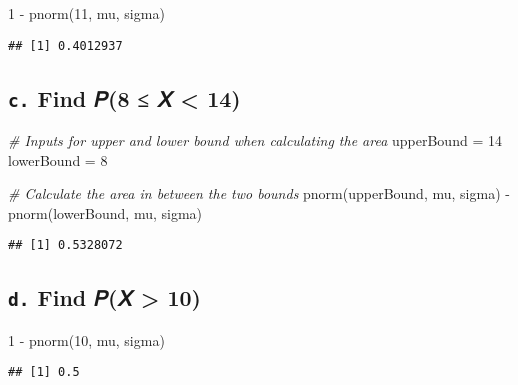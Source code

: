 \documentclass[
  12pt,
]{article}
\newenvironment{Shaded}{\begin{snugshade}}{\end{snugshade}}
\newcommand{\CommentTok}[1]{\textcolor[rgb]{0.56,0.35,0.01}{\textit{#1}}}
\newcommand{\DecValTok}[1]{\textcolor[rgb]{0.00,0.00,0.81}{#1}}
\newcommand{\FunctionTok}[1]{\textcolor[rgb]{0.00,0.00,0.00}{#1}}
\newcommand{\NormalTok}[1]{#1}
\newcommand{\OtherTok}[1]{\textcolor[rgb]{0.56,0.35,0.01}{#1}}
\newcommand{\SpecialCharTok}[1]{\textcolor[rgb]{0.00,0.00,0.00}{#1}}
\begin{document}
\begin{Shaded}
\begin{Highlighting}[]
\DecValTok{1} \SpecialCharTok{{-}} \FunctionTok{pnorm}\NormalTok{(}\DecValTok{11}\NormalTok{, mu, sigma)}
\end{Highlighting}
\end{Shaded}

\begin{verbatim}
## [1] 0.4012937
\end{verbatim}

\hypertarget{c.-find-ux1d4438-ux1d44b-14}{%
\subsection{\texorpdfstring{\texttt{c.} Find 𝑃(8 ≤ 𝑋 \textless{}
14)}{c. Find 𝑃(8 ≤ 𝑋 \textless{} 14)}}\label{c.-find-ux1d4438-ux1d44b-14}}

\begin{Shaded}
\begin{Highlighting}[]
\CommentTok{\# Inputs for upper and lower bound when calculating the area}
\NormalTok{upperBound }\OtherTok{=} \DecValTok{14}
\NormalTok{lowerBound }\OtherTok{=} \DecValTok{8}

\CommentTok{\# Calculate the area in between the two bounds}
\FunctionTok{pnorm}\NormalTok{(upperBound, mu, sigma) }\SpecialCharTok{{-}} \FunctionTok{pnorm}\NormalTok{(lowerBound, mu, sigma)}
\end{Highlighting}
\end{Shaded}

\begin{verbatim}
## [1] 0.5328072
\end{verbatim}

\hypertarget{d.-find-ux1d443ux1d44b-10}{%
\subsection{\texorpdfstring{\texttt{d.} Find 𝑃(𝑋 \textgreater{}
10)}{d. Find 𝑃(𝑋 \textgreater{} 10)}}\label{d.-find-ux1d443ux1d44b-10}}

\begin{Shaded}
\begin{Highlighting}[]
\DecValTok{1} \SpecialCharTok{{-}} \FunctionTok{pnorm}\NormalTok{(}\DecValTok{10}\NormalTok{, mu, sigma)}
\end{Highlighting}
\end{Shaded}

\begin{verbatim}
## [1] 0.5
\end{verbatim}
\end{document}
